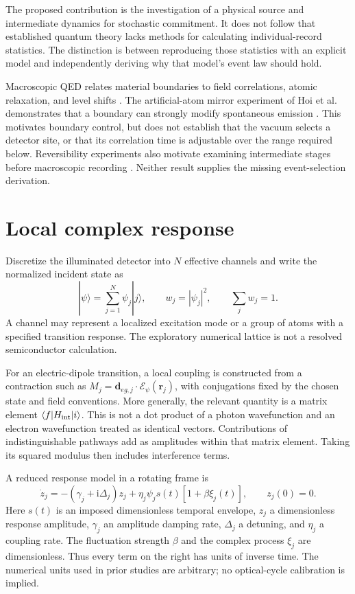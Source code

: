 \documentclass[11pt]{article}
\newcommand{\ii}{\mathrm i}
\begin{document}
The proposed contribution is the investigation of a physical source and intermediate dynamics for stochastic commitment. It does not follow that established quantum theory lacks methods for calculating individual-record statistics. The distinction is between reproducing those statistics with an explicit model and independently deriving why that model's event law should hold.

Macroscopic QED relates material boundaries to field correlations, atomic relaxation, and level shifts \cite{scheel}. The artificial-atom mirror experiment of Hoi et al. demonstrates that a boundary can strongly modify spontaneous emission \cite{hoi}. This motivates boundary control, but does not establish that the vacuum selects a detector site, or that its correlation time is adjustable over the range required below. Reversibility experiments also motivate examining intermediate stages before macroscopic recording \cite{katz}. Neither result supplies the missing event-selection derivation.

\section{Local complex response}
Discretize the illuminated detector into $N$ effective channels and write the normalized incident state as
\begin{equation}
 |\psi\rangle=\sum_{j=1}^{N}\psi_j|j\rangle,\qquad
 w_j=|\psi_j|^2,\qquad \sum_j w_j=1.
\end{equation}
A channel may represent a localized excitation mode or a group of atoms with a specified transition response. The exploratory numerical lattice is not a resolved semiconductor calculation.

For an electric-dipole transition, a local coupling is constructed from a contraction such as $M_j=\mathbf d_{eg,j}\cdot\boldsymbol{\mathcal E}_\psi(\mathbf r_j)$, with conjugations fixed by the chosen state and field conventions. More generally, the relevant quantity is a matrix element $\langle f|H_{\rm int}|i\rangle$. This is not a dot product of a photon wavefunction and an electron wavefunction treated as identical vectors. Contributions of indistinguishable pathways add as amplitudes within that matrix element. Taking its squared modulus then includes interference terms.

A reduced response model in a rotating frame is
\begin{equation}\label{eq:response}
 \dot z_j=-(\gamma_j+\ii\Delta_j)z_j+
 \eta_j\psi_j s(t)[1+\beta\xi_j(t)],\qquad z_j(0)=0.
\end{equation}
Here $s(t)$ is an imposed dimensionless temporal envelope, $z_j$ a dimensionless response amplitude, $\gamma_j$ an amplitude damping rate, $\Delta_j$ a detuning, and $\eta_j$ a coupling rate. The fluctuation strength $\beta$ and the complex process $\xi_j$ are dimensionless. Thus every term on the right has units of inverse time. The numerical units used in prior studies are arbitrary; no optical-cycle calibration is implied.
\end{document}
